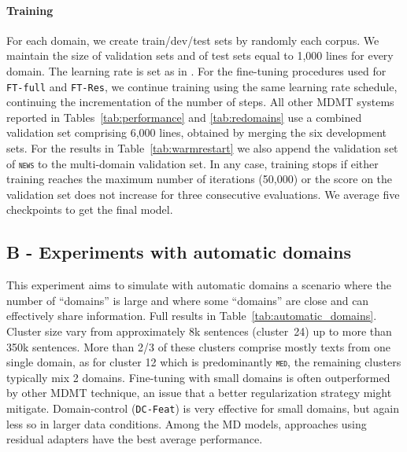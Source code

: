 \documentclass[11pt,a4paper]{article}
\newcommand{\fyDone}[1]{\done[FY]\Todo[FY:]{\textcolor{orange}{#1}}}
\newcommand{\revision}[1]{#1}
\newcommand{\domain}[1]{\texttt{\textsc{#1}}}
\newcommand{\system}[1]{\texttt{{#1}}}
\begin{document}
{\paragraph{Training} For each domain, we create train/dev/test sets by randomly each corpus. We maintain the size of validation sets and of test sets equal to 1,000 lines for every domain.
The learning rate is set
as in \cite{Vaswani17attention}. For the fine-tuning procedures used for \system{FT-full} and \system{FT-Res}, we continue training using the same learning rate schedule, continuing the incrementation of the number of steps. All other MDMT systems reported in Tables~\ref{tab:performance} and \ref{tab:redomains} use a combined validation set comprising 6,000 lines, obtained by merging the six development sets. For the results in Table~\ref{tab:warmrestart} we also append the validation set of \domain{news} to the multi-domain validation set. In any case, training stops if either training reaches the maximum number of iterations (50,000)\fyDone{How many ?} or the score on the validation set does not increase for three consecutive evaluations. We average five checkpoints to get the final model.\fyDone{up to the best ?}
}
\subsection*{B - Experiments with automatic domains \label{ssec:full-automatic}}
\revision{
  This experiment aims to simulate with automatic domains a scenario where the number of ``domains'' is large and where some ``domains'' are close and can effectively share information. Full results in Table~\ref{tab:automatic_domains}. Cluster size vary from approximately 8k sentences (cluster~24) up to more than 350k sentences. More than 2/3 of these clusters comprise mostly texts from one single domain, as for cluster 12 which is predominantly \domain{med}, the remaining clusters typically mix 2 domains. Fine-tuning with small domains is often outperformed by other MDMT technique, an issue that a better regularization strategy might mitigate. Domain-control (\system{DC-Feat}) is very effective for small domains, but again less so in larger data conditions. Among the MD models, approaches using residual adapters have the best average performance.}
\end{document}
